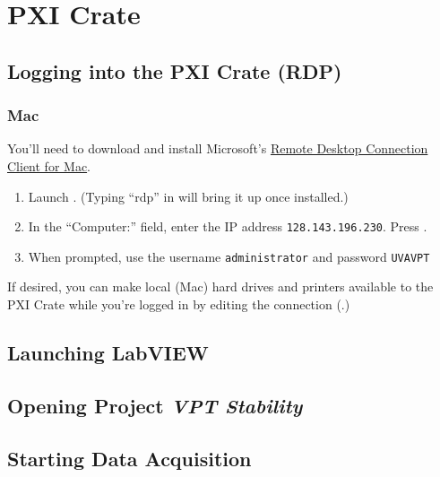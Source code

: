 
\section{PXI Crate}
\label{sec:op_pxi}

\subsection{Logging into the PXI Crate (RDP)}
\label{sec:op_pxi:rdp}

\subsubsection{Mac}
\label{sec:op_pxi:rdp:mac}

You'll need to download and install Microsoft's \href{http://www.microsoft.com/mac/products/remote-desktop/default.mspx}{Remote Desktop Connection Client for Mac}.

\begin{enumerate}
\item Launch .  (Typing ``rdp'' in  will bring it up once installed.)
\item In the ``Computer:'' field, enter the IP address \texttt{128.143.196.230}.  Press .
\item When prompted, use the username \texttt{administrator} and password \texttt{UVAVPT}
\end{enumerate}

If desired, you can make local (Mac) hard drives and printers available to the PXI Crate while you're logged in by editing the connection (.)

\subsection{Launching LabVIEW}
\label{sec:op_pxi:labview_launch}

\subsection{Opening Project \textit{VPT Stability}}
\label{sec:op_pxi:project_vptstability}

\subsection{Starting Data Acquisition}
\label{sec:op_pxi:daq_start}

